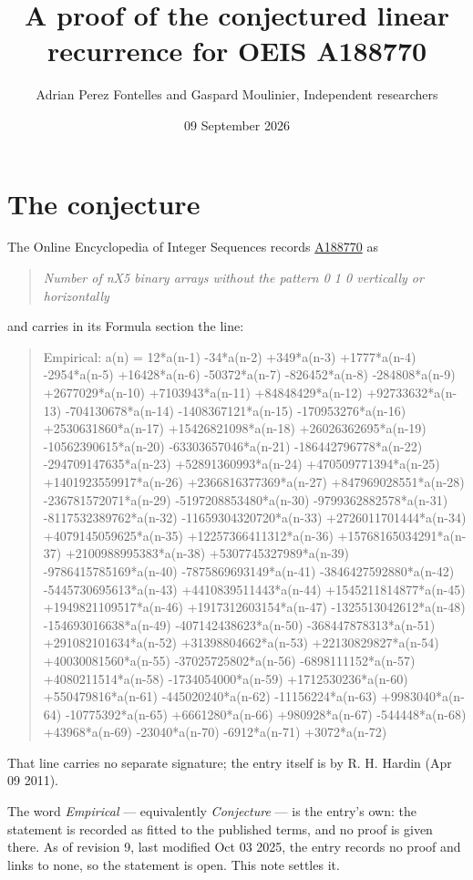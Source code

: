 \documentclass[11pt]{article}
\title{A proof of the conjectured linear recurrence for OEIS A188770}
\author{Adrian Perez Fontelles and Gaspard Moulinier, Independent researchers}
\date{09 September 2026}
\theoremstyle{definition}
\begin{document}
\maketitle
\section{The conjecture}

The Online Encyclopedia of Integer Sequences records \href{https://oeis.org/A188770}{A188770} as

\begin{quote}\itshape Number of nX5 binary arrays without the pattern 0 1 0 vertically or horizontally\end{quote}

and carries in its Formula section the line:

\begin{quote}\ttfamily Empirical: a(n) = 12*a(n-1) -34*a(n-2) +349*a(n-3) +1777*a(n-4) -2954*a(n-5) +16428*a(n-6) -50372*a(n-7) -826452*a(n-8) -284808*a(n-9) +2677029*a(n-10) +7103943*a(n-11) +84848429*a(n-12) +92733632*a(n-13) -704130678*a(n-14) -1408367121*a(n-15) -170953276*a(n-16) +2530631860*a(n-17) +15426821098*a(n-18) +26026362695*a(n-19) -10562390615*a(n-20) -63303657046*a(n-21) -186442796778*a(n-22) -294709147635*a(n-23) +52891360993*a(n-24) +470509771394*a(n-25) +1401923559917*a(n-26) +2366816377369*a(n-27) +847969028551*a(n-28) -236781572071*a(n-29) -5197208853480*a(n-30) -9799362882578*a(n-31) -8117532389762*a(n-32) -11659304320720*a(n-33) +2726011701444*a(n-34) +4079145059625*a(n-35) +12257366411312*a(n-36) +15768165034291*a(n-37) +2100988995383*a(n-38) +5307745327989*a(n-39) -9786415785169*a(n-40) -7875869693149*a(n-41) -3846427592880*a(n-42) -5445730695613*a(n-43) +4410839511443*a(n-44) +1545211814877*a(n-45) +1949821109517*a(n-46) +1917312603154*a(n-47) -1325513042612*a(n-48) -154693016638*a(n-49) -407142438623*a(n-50) -368447878313*a(n-51) +291082101634*a(n-52) +31398804662*a(n-53) +22130829827*a(n-54) +40030081560*a(n-55) -37025725802*a(n-56) -6898111152*a(n-57) +4080211514*a(n-58) -1734054000*a(n-59) +1712530236*a(n-60) +550479816*a(n-61) -445020240*a(n-62) -11156224*a(n-63) +9983040*a(n-64) -10775392*a(n-65) +6661280*a(n-66) +980928*a(n-67) -544448*a(n-68) +43968*a(n-69) -23040*a(n-70) -6912*a(n-71) +3072*a(n-72)\end{quote}

That line carries no separate signature; the entry itself is by R. H. Hardin (Apr 09 2011).

The word {\itshape Empirical} --- equivalently {\itshape Conjecture} --- is the entry's own: the statement is recorded as fitted to the published terms, and no proof is given there. As of revision 9, last modified Oct 03 2025, the entry records no proof and links to none, so the statement is open. This note settles it.
\end{document}
